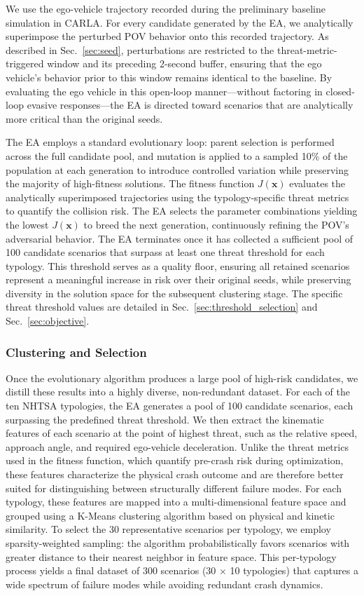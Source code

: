 We use the ego-vehicle trajectory recorded during the preliminary baseline simulation in CARLA. For every candidate generated by the EA, we analytically superimpose the perturbed POV behavior onto this recorded trajectory. As described in Sec.~\ref{sec:seed}, perturbations are restricted to the threat-metric-triggered window and its preceding 2-second buffer, ensuring that the ego vehicle's behavior prior to this window remains identical to the baseline. By evaluating the ego vehicle in this open-loop manner---without factoring in closed-loop evasive responses---the EA is directed toward scenarios that are analytically more critical than the original seeds.

The EA employs a standard evolutionary loop: parent selection is performed across the full candidate pool, and mutation is applied to a sampled 10\% of the population at each generation to introduce controlled variation while preserving the majority of high-fitness solutions. The fitness function $J(\mathbf{x})$ evaluates the analytically superimposed trajectories using the typology-specific threat metrics to quantify the collision risk. The EA selects the parameter combinations yielding the lowest $J(\mathbf{x})$ to breed the next generation, continuously refining the POV's adversarial behavior. The EA terminates once it has collected a sufficient pool of 100 candidate scenarios that surpass at least one threat threshold for each typology. This threshold serves as a quality floor, ensuring all retained scenarios represent a meaningful increase in risk over their original seeds, while preserving diversity in the solution space for the subsequent clustering stage. The specific threat threshold values are detailed in Sec.~\ref{sec:threshold_selection} and Sec.~\ref{sec:objective}.

\subsubsection{Clustering and Selection}
Once the evolutionary algorithm produces a large pool of high-risk candidates, we distill these results into a highly diverse, non-redundant dataset. For each of the ten NHTSA typologies, the EA generates a pool of 100 candidate scenarios, each surpassing the predefined threat threshold. We then extract the kinematic features of each scenario at the point of highest threat, such as the relative speed, approach angle, and required ego-vehicle deceleration. Unlike the threat metrics used in the fitness function, which quantify pre-crash risk during optimization, these features characterize the physical crash outcome and are therefore better suited for distinguishing between structurally different failure modes. For each typology, these features are mapped into a multi-dimensional feature space and grouped using a K-Means clustering algorithm based on physical and kinetic similarity. To select the 30 representative scenarios per typology, we employ sparsity-weighted sampling: the algorithm probabilistically favors scenarios with greater distance to their nearest neighbor in feature space. This per-typology process yields a final dataset of 300 scenarios (30 $\times$ 10 typologies) that captures a wide spectrum of failure modes while avoiding redundant crash dynamics.
